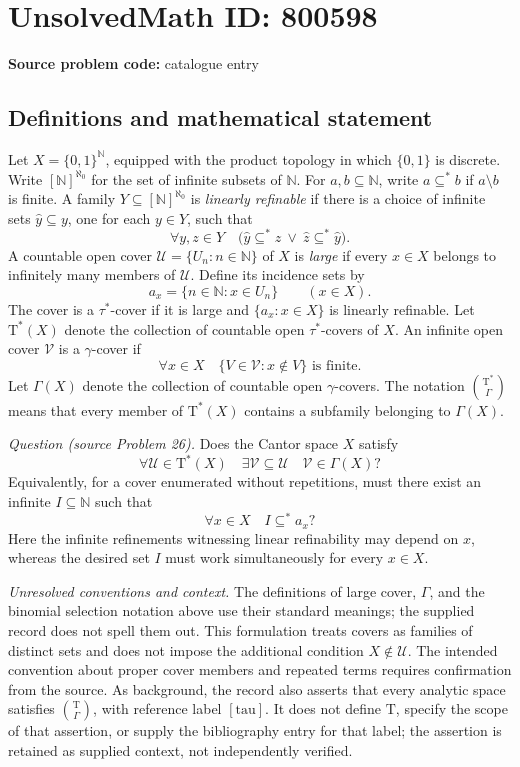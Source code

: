 \documentclass[11pt]{article}
\newcommand{\N}{\mathbb{N}}
\begin{document}
\section*{UnsolvedMath ID: 800598}
\textbf{Source problem code:} catalogue entry
\subsection{Definitions and mathematical statement}
Let \(X=\{0,1\}^{\N}\), equipped with the product topology in which \(\{0,1\}\) is discrete. Write \([\N]^{\aleph_0}\) for the set of infinite subsets of \(\N\). For \(a,b\subseteq\N\), write \(a\subseteq^*b\) if \(a\setminus b\) is finite. A family \(Y\subseteq[\N]^{\aleph_0}\) is \emph{linearly refinable} if there is a choice of infinite sets \(\widehat y\subseteq y\), one for each \(y\in Y\), such that
\[
\forall y,z\in Y\quad
\bigl(\widehat y\subseteq^*\widehat z\ \lor\ \widehat z\subseteq^*\widehat y\bigr).
\]
A countable open cover \(\mathcal U=\{U_n:n\in\N\}\) of \(X\) is \emph{large} if every \(x\in X\) belongs to infinitely many members of \(\mathcal U\). Define its incidence sets by
\[
a_x=\{n\in\N:x\in U_n\}\qquad(x\in X).
\]
The cover is a \(\tau^*\)-cover if it is large and \(\{a_x:x\in X\}\) is linearly refinable. Let \(\mathrm T^*(X)\) denote the collection of countable open \(\tau^*\)-covers of \(X\). An infinite open cover \(\mathcal V\) is a \(\gamma\)-cover if
\[
\forall x\in X\quad \{V\in\mathcal V:x\notin V\}\text{ is finite}.
\]
Let \(\Gamma(X)\) denote the collection of countable open \(\gamma\)-covers. The notation \(\binom{\mathrm T^*}{\Gamma}\) means that every member of \(\mathrm T^*(X)\) contains a subfamily belonging to \(\Gamma(X)\).

\emph{Question (source Problem 26).} Does the Cantor space \(X\) satisfy
\[
\forall\mathcal U\in\mathrm T^*(X)\quad
\exists\mathcal V\subseteq\mathcal U\quad
\mathcal V\in\Gamma(X)?
\]
Equivalently, for a cover enumerated without repetitions, must there exist an infinite \(I\subseteq\N\) such that
\[
\forall x\in X\quad I\subseteq^*a_x?
\]
Here the infinite refinements witnessing linear refinability may depend on \(x\), whereas the desired set \(I\) must work simultaneously for every \(x\in X\).

\emph{Unresolved conventions and context.} The definitions of large cover, \(\Gamma\), and the binomial selection notation above use their standard meanings; the supplied record does not spell them out. This formulation treats covers as families of distinct sets and does not impose the additional condition \(X\notin\mathcal U\). The intended convention about proper cover members and repeated terms requires confirmation from the source. As background, the record also asserts that every analytic space satisfies \(\binom{\mathrm T}{\Gamma}\), with reference label \([\mathrm{tau}]\). It does not define \(\mathrm T\), specify the scope of that assertion, or supply the bibliography entry for that label; the assertion is retained as supplied context, not independently verified.
\end{document}
